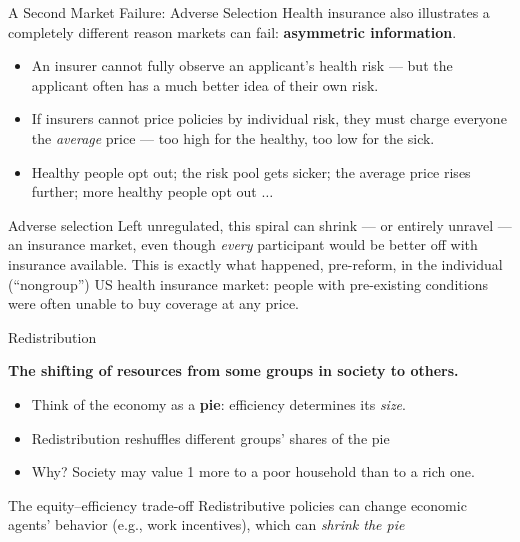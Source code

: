 \documentclass[11pt,aspectratio=169]{beamer}
\begin{document}
\begin{frame}{A Second Market Failure: Adverse Selection}
  \small
  Health insurance also illustrates a completely different reason markets can fail: \textbf{asymmetric information}.
  \begin{itemize}
    \setlength{\itemsep}{2pt}
    \item An insurer cannot fully observe an applicant's health risk --- but the applicant often has a much better idea of their own risk.
    \item If insurers cannot price policies by individual risk, they must charge everyone the \emph{average} price --- too high for the healthy, too low for the sick.
    \item Healthy people opt out; the risk pool gets sicker; the average price rises further; more healthy people opt out $\ldots$
  \end{itemize}
  \vspace{0.3em}
  \begin{alertblock}{Adverse selection}
    Left unregulated, this spiral can shrink --- or entirely unravel --- an insurance market, even though \emph{every} participant would be better off with insurance available. This is exactly what happened, pre-reform, in the individual (``nongroup'') US health insurance market: people with pre-existing conditions were often unable to buy coverage at any price.
  \end{alertblock}
\end{frame}



\begin{frame}{Redistribution}

\textbf{The shifting of resources from some groups in society to others.}

  \begin{itemize}
    \item Think of the economy as a \textbf{pie}: efficiency determines its \emph{size}.
    \item Redistribution reshuffles different groups' shares of the pie
    \item Why? Society may  value \texteuro{}1 more to a poor household than to a rich one.
  \end{itemize}
  \vspace{0.5em}
  \begin{alertblock}{The equity--efficiency trade-off}
  \vspace{0.2cm}
    Redistributive policies can change economic agents' behavior (e.g., work incentives), which can \emph{shrink the pie}
  \end{alertblock}
\end{frame}
\end{document}
